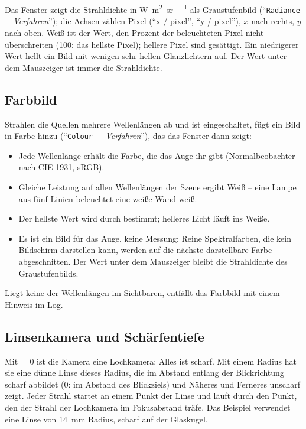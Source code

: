 Das Fenster  zeigt die Strahldichte in \si{\watt\per\square\metre\per\steradian} als
Graustufenbild (\enquote{\texttt{Radiance – }\textit{Verfahren}}); die Achsen zählen Pixel
(\enquote{x / pixel}, \enquote{y / pixel}), $x$ nach rechts, $y$ nach oben. Weiß ist der Wert,
den  Prozent der beleuchteten Pixel nicht überschreiten (100: das
hellste Pixel); hellere Pixel sind gesättigt. Ein niedrigerer Wert hellt ein Bild mit wenigen
sehr hellen Glanzlichtern auf. Der Wert unter dem Mauszeiger ist immer die Strahldichte.

\subsection{Farbbild}\label{sec:pt-farbbild}

Strahlen die Quellen mehrere Wellenlängen ab und ist  eingeschaltet, fügt
 ein Bild in Farbe hinzu (\enquote{\texttt{Colour – }\textit{Verfahren}}),
das das Fenster dann zeigt:
\begin{itemize}
  \item Jede Wellenlänge erhält die Farbe, die das Auge ihr gibt (Normalbeobachter nach CIE 1931,
    sRGB).
  \item Gleiche Leistung auf allen Wellenlängen der Szene ergibt Weiß -- eine Lampe aus fünf
    Linien beleuchtet eine weiße Wand weiß.
  \item Der hellste Wert wird durch  bestimmt; helleres Licht läuft
    ins Weiße.
  \item Es ist ein Bild für das Auge, keine Messung: Reine Spektralfarben, die kein Bildschirm
    darstellen kann, werden auf die nächste darstellbare Farbe abgeschnitten. Der Wert unter dem
    Mauszeiger bleibt die Strahldichte des Graustufenbilds.
\end{itemize}
Liegt keine der Wellenlängen im Sichtbaren, entfällt das Farbbild mit einem Hinweis im Log.

\subsection{Linsenkamera und Schärfentiefe}\label{sec:pt-linsenkamera}

Mit  = 0 ist die Kamera eine Lochkamera: Alles ist scharf. Mit einem Radius hat
sie eine dünne Linse dieses Radius, die im Abstand  entlang der Blickrichtung
scharf abbildet (0: im Abstand des Blickziels) und Näheres und Ferneres unscharf zeigt. Jeder
Strahl startet an einem Punkt der Linse und läuft durch den Punkt, den der Strahl der Lochkamera
im Fokusabstand träfe. Das Beispiel  verwendet eine Linse von
\SI{14}{\milli\metre} Radius, scharf auf der Glaskugel.

